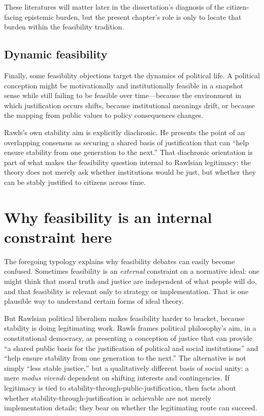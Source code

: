 \documentclass[12pt]{report}
\begin{document}
These literatures will matter later in the dissertation's diagnosis of the citizen-facing epistemic burden, but the present chapter's role is only to locate that burden within the feasibility tradition.

\subsection{Dynamic feasibility}

Finally, some feasibility objections target the dynamics of political life. A political conception might be motivationally and institutionally feasible in a snapshot sense while still failing to be feasible over time---because the environment in which justification occurs shifts, because institutional meanings drift, or because the mapping from public values to policy consequences changes.

Rawls's own stability aim is explicitly diachronic. He presents the point of an overlapping consensus as securing a shared basis of justification that can ``help ensure stability from one generation to the next.''\parencite[p.~1]{rawls1987overlapping} That diachronic orientation is part of what makes the feasibility question internal to Rawlsian legitimacy: the theory does not merely ask whether institutions would be just, but whether they can be stably justified to citizens across time.

\section{Why feasibility is an internal constraint here}\label{sec:bridge}

The foregoing typology explains why feasibility debates can easily become confused. Sometimes feasibility is an \emph{external} constraint on a normative ideal: one might think that moral truth and justice are independent of what people will do, and that feasibility is relevant only to strategy or implementation. That is one plausible way to understand certain forms of ideal theory.

But Rawlsian political liberalism makes feasibility harder to bracket, because stability is doing legitimating work. Rawls frames political philosophy's aim, in a constitutional democracy, as presenting a conception of justice that can provide ``a shared public basis for the justification of political and social institutions'' and ``help ensure stability from one generation to the next.''\parencite[p.~1]{rawls1987overlapping} The alternative is not simply ``less stable justice,'' but a qualitatively different basis of social unity: a mere \emph{modus vivendi} dependent on shifting interests and contingencies.\parencite[p.~1]{rawls1987overlapping} If legitimacy is tied to stability-through-public-justification, then facts about whether stability-through-justification is achievable are not merely implementation details; they bear on whether the legitimating route can succeed.
\end{document}

